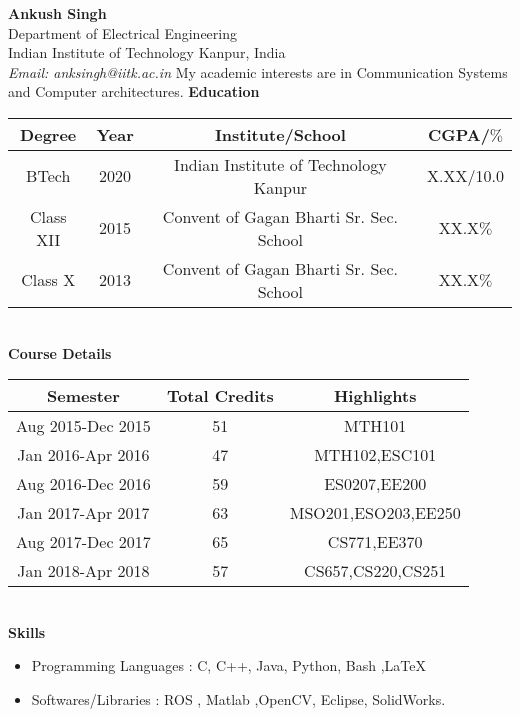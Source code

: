 \documentclass[a4paper,18pt]{article}
\begin{document}
\noindent
\textbf{Ankush Singh}\\
Department of Electrical Engineering\\
Indian Institute of Technology Kanpur, India\\
\textit{Email: anksingh@iitk.ac.in}
\vspace{1pc}
\hline \hline
\noindent
My academic interests are in Communication Systems and Computer architectures.
\hline \hline
\vspace{1pc}
\textbf{Education}
\begin{table}[ht]
\begin{center}
\begin{tabular}{|c|c|c|c|}
\hline
{\bf Degree} & {\bf Year} & {\bf Institute/School } & {\bf CGPA/$\%$ }\\
\hline
BTech & 2020 & Indian Institute of Technology Kanpur & X.XX/10.0 \\
\hline
Class XII & 2015 & Convent of Gagan Bharti Sr. Sec. School & XX.X$\%$\\
\hline
Class X & 2013 & Convent of Gagan Bharti Sr. Sec. School & XX.X$\%$\\
\hline
\end{tabular}
\label{table:simple}
\end{center}
\end{table}\\
\textbf{Course Details}
\begin{table}[ht]
\begin{center}
\begin{tabular}{|c|c|c|}
\hline
{\bf Semester} & {\bf Total Credits} & {\bf Highlights}\\
\hline
Aug 2015-Dec 2015 & 51 & MTH101 \\
\hline
Jan 2016-Apr 2016 & 47 & MTH102,ESC101 \\
\hline
Aug 2016-Dec 2016 & 59 & ES0207,EE200 \\
\hline
Jan 2017-Apr 2017 & 63 & MSO201,ESO203,EE250 \\
\hline
Aug 2017-Dec 2017 & 65 & CS771,EE370 \\
\hline
Jan 2018-Apr 2018 & 57 & CS657,CS220,CS251 \\
\hline
\end{tabular}
\label{table:simple}
\end{center}
\end{table}\\
\textbf{Skills}
\begin{itemize}
\item Programming Languages : C, C++, Java, Python, Bash ,\LaTeX
\item Softwares/Libraries : ROS , Matlab ,OpenCV, Eclipse, SolidWorks.
\end{itemize}
\end{document}
